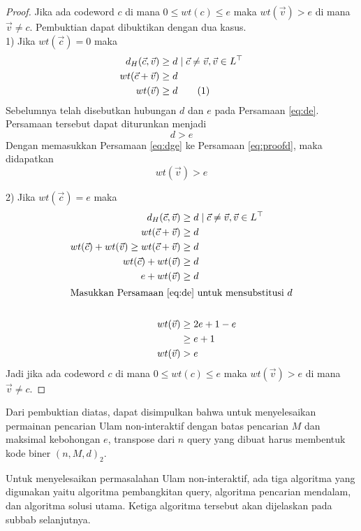 \begin{proof}
Jika ada codeword $c$ di mana $0 \le wt(c) \le e$ maka $wt(\vec{v}) > e$ di mana $\vec{v} \neq c$. Pembuktian dapat dibuktikan dengan dua kasus.\\

1) Jika $wt(\vec{c}) = 0$ maka
\begin{align*}
d_H(\vec{c},\vec{v}) &\ge d \mid \vec{c} \neq \vec{v} , \vec{v} \in L^\top \\
wt(\vec{c} + \vec{v}) &\ge d \\
wt(\vec{v}) &\ge d \label{eq:proofd} \stepcounter{equation} \tag{\theequation}
\end{align*}
Sebelumnya telah disebutkan hubungan $d$ dan $e$ pada Persamaan \ref{eq:de}. Persamaan tersebut dapat diturunkan menjadi
\begin{equation} \label{eq:dge}
d > e
\end{equation}
Dengan memasukkan Persamaan \ref{eq:dge} ke Persamaan \ref{eq:proofd}, maka didapatkan
\begin{equation*}
wt(\vec{v}) > e
\end{equation*}

2) Jika $wt(\vec{c}) = e$ maka
\begin{align*}
d_H(\vec{c},\vec{v}) &\ge d \mid \vec{c} \neq \vec{v} , \vec{v} \in L^\top \\
wt(\vec{c}+\vec{v}) &\ge d \\
wt(\vec{c}) + wt(\vec{v}) \ge wt(\vec{c}+\vec{v}) &\ge d \\
wt(\vec{c}) + wt(\vec{v}) &\ge d \\
e + wt(\vec{v}) &\ge d \\
\intertext{Masukkan Persamaan \ref{eq:de} untuk mensubstitusi $d$}\\
wt(\vec{v}) &\ge 2e+1-e \\
&\ge e+1\\
wt(\vec{v}) &> e
\end{align*}
Jadi jika ada codeword $c$ di mana $0 \le wt(c) \le e$ maka $wt(\vec{v}) > e$ di mana $\vec{v} \neq c$.
\end{proof}

Dari pembuktian diatas, dapat disimpulkan bahwa untuk menyelesaikan permainan pencarian Ulam non-interaktif dengan batas pencarian $M$ dan maksimal kebohongan $e$, transpose dari $n$ query yang dibuat harus membentuk kode biner $(n,M,d)_2$.

Untuk menyelesaikan permasalahan Ulam non-interaktif, ada tiga algoritma yang digunakan yaitu algoritma pembangkitan query, algoritma pencarian mendalam, dan algoritma solusi utama. Ketiga algoritma tersebut akan dijelaskan pada subbab selanjutnya.

